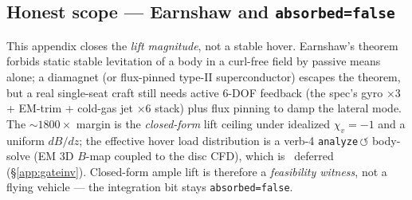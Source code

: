\subsection{Honest scope --- Earnshaw and \texttt{absorbed=false}}
\label{app:stage1-scope}

This appendix closes the \emph{lift magnitude}, not a stable hover.
Earnshaw's theorem \citep{earnshaw1842} forbids static stable levitation
of a body in a curl-free field by passive means alone; a diamagnet
(or flux-pinned type-II superconductor) escapes the theorem, but a real
single-seat craft still needs active 6-DOF feedback (the spec's gyro
$\times3$ + EM-trim + cold-gas jet $\times6$ stack) plus flux pinning to
damp the lateral mode. The $\sim\!1800\times$ margin is the
\emph{closed-form} lift ceiling under idealized $\chi_v=-1$ and a uniform
$dB/dz$; the effective hover load distribution is a verb-4
\texttt{analyze}\,$\circlearrowleft$ body-solve (EM 3D $B$-map coupled to
the disc CFD), which is \tierOrange\ deferred (\S\ref{app:gateinv}).
Closed-form ample lift is therefore a \emph{feasibility witness}, not a
flying vehicle --- the integration bit stays \texttt{absorbed=false}.
